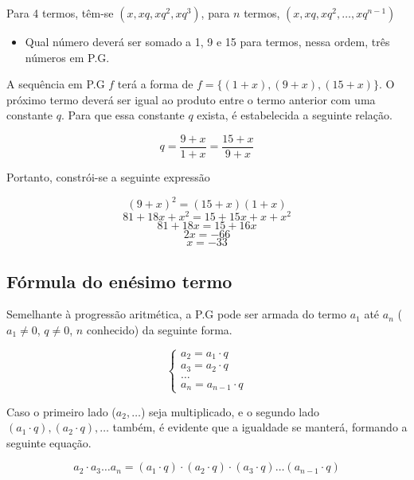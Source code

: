 \documentclass[11pt]{article}
\begin{document}
Para 4 termos, têm-se $\left(x, xq, xq^{2}, xq^{3}\right)$, para $n$ termos, $\left(x, xq, xq^{2}, \dots, xq^{n - 1}\right)$

\begin{tcolorbox}[colback=LightYellow]
\begin{itemize}
  \item Qual número deverá ser somado a 1, 9 e 15 para termos, nessa ordem, três números em P.G.
\end{itemize}
\end{tcolorbox}

\begin{tcolorbox}[colback=LightYellow]
A sequência em P.G $f$ terá a forma de $f = \{(1 + x), (9 + x), (15 + x)\}$. O próximo termo deverá ser igual ao produto entre o termo anterior com uma constante $q$. Para que essa constante $q$ exista, é estabelecida a seguinte relação.

\[q = \frac{9 + x}{1 + x} = \frac{15 + x}{9 + x}\]

Portanto, constrói-se a seguinte expressão

\[(9 + x)^{2} = (15 + x)(1 + x)\]
\[81 + 18x + x^{2} = 15 + 15x + x + x^{2}\]
\[81 + 18x = 15 + 16x\]
\[2x = -66\]
\[x = -33\]
\end{tcolorbox}

\subsection{Fórmula do enésimo termo}

Semelhante à progressão aritmética, a P.G pode ser armada do termo $a_{1}$ até $a_{n}$ ($a_{1} \neq 0$, $q \neq 0$, $n$ conhecido) da seguinte forma.

\begin{equation*}
\begin{cases}
a_{2} = a_{1}\cdot q \\
a_{3} = a_{2}\cdot q \\
\dots \\
a_{n} = a_{n - 1} \cdot q
\end{cases}
\end{equation*}

Caso o primeiro lado ($a_{2}, \dots$) seja multiplicado, e o segundo lado $(a_{1}\cdot q), (a_{2}\cdot q), \dots$ também, é evidente que a igualdade se manterá, formando a seguinte equação.

\[a_{2} \cdot a_{3}\dots a_{n} = (a_1\cdot q) \cdot (a_2\cdot q) \cdot (a_3\cdot q) \dots (a_{n - 1} \cdot q)\]
\end{document}
